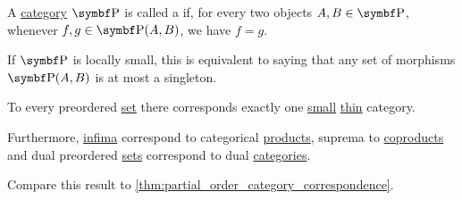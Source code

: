\begin{definition}\label{def:thin_category}\cite{nLab:thin_category}
  A \hyperref[def:category]{category} \( \Cat{P} \) is called a  if, for every two objects \( A, B \in \Bold{P} \), whenever \( f, g \in \Bold{P}(A, B) \), we have \( f = g \).

  If \( \Cat{P} \) is locally small, this is equivalent to saying that any set of morphisms \( \Bold{P}(A, B) \) is at most a singleton.
\end{definition}

\begin{proposition}\label{thm:preorder_category_correspondence}
  To every preordered \hyperref[def:preordered_set]{set} there corresponds exactly one \hyperref[def:category_cardinality]{small} \hyperref[def:thin_category]{thin} category.

  Furthermore, \hyperref[def:preordered_set/supremum_infimum]{infima} correspond to categorical \hyperref[def:categorical_product]{products}, suprema to \hyperref[def:categorical_coproduct]{coproducts} and dual preordered \hyperref[def:preordered_set/dual]{sets} correspond to dual \hyperref[def:opposite_category]{categories}.

  Compare this result to \cref{thm:partial_order_category_correspondence}.
\end{proposition}
